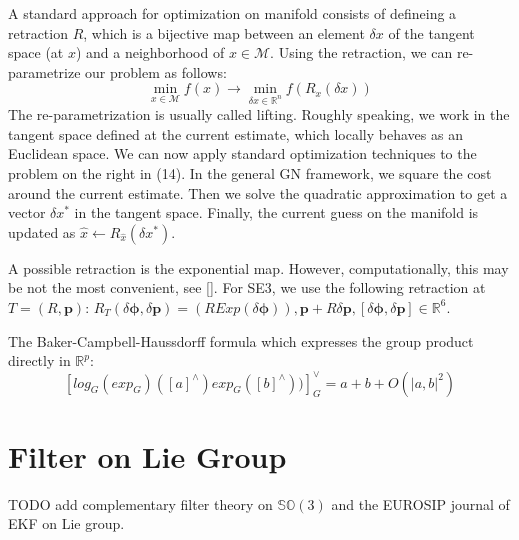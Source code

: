 \documentclass[a4paper]{report}
\begin{document}
A standard approach for optimization on manifold consists of defineing a retraction $R$, which is a bijective map between an element $\delta x$ of the tangent space (at $x$) and a neighborhood of $x \in \mathcal{M}$. Using the retraction, we can re-parametrize our problem as follows:
\begin{equation}
{\operatorname*{min}_{x \in \mathcal{M}} {f(x)}} \rightarrow {\operatorname*{min}_{\delta x \in \mathbb{R}^n} {f(R_x(\delta x))}}
\end{equation}
The re-parametrization is usually called lifting. Roughly speaking, we work in the tangent space defined at the current estimate, which locally behaves as an Euclidean space. We can now apply standard optimization techniques to the problem on the right in (14). In the general GN framework, we square the cost around the current estimate. Then we solve the quadratic approximation to get a vector $\delta x^*$ in the tangent space. Finally, the current guess on the manifold is updated as $\hat{x} \leftarrow R_{\hat{x}}(\delta x^*)$. 

A possible retraction is the exponential map. However, computationally, this may be not the most convenient, see [].
For SE3, we use the following retraction at $T=(R,\bm{p})$:
$R_T(\delta \bm{\phi}, \delta \bm{p})=(R Exp(\delta \bm{\phi})), \bm{p}+R\delta \bm{p}, [\delta \bm{\phi}, \delta \bm{p}]\in \mathbb{R}^6$.

The Baker-Campbell-Haussdorff formula which expresses the group product directly in $\mathbb{R}^p$:
$$
[log_G{(exp_G)([a]^\land)exp_G([b]^\land))}]_G^\vee = a + b + O(|a,b|^2)
$$

\section{Filter on Lie Group}
TODO add complementary filter theory on $\mathbb{SO}(3)$ and the EUROSIP journal of EKF on Lie group.
\end{document}

